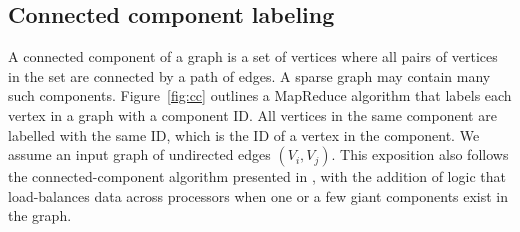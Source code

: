 \subsection{Connected component labeling}

A connected component of a graph is a set of vertices where all pairs
of vertices in the set are connected by a path of edges.  A sparse
graph may contain many such components.  Figure~\ref{fig:cc} outlines
a MapReduce algorithm that labels each vertex in a graph with a
component ID.  All vertices in the same component are labelled with
the same ID, which is the ID of a vertex in the component.  We assume
an input graph of undirected edges $(V_i,V_j)$.  This exposition also
follows the connected-component algorithm presented in \cite{Cohen},
with the addition of logic that load-balances data across processors
when one or a few giant components exist in the graph.

